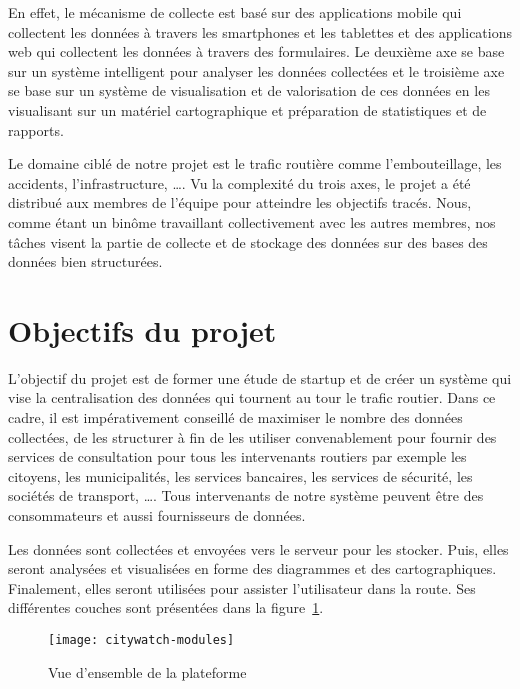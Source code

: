 En effet, le mécanisme de collecte est basé sur des applications mobile qui
collectent les données à travers les smartphones et les tablettes et des
applications web qui collectent les données à travers des formulaires. Le
deuxième axe se base sur un système intelligent pour analyser les données
collectées et le troisième axe se base sur un système de visualisation et de
valorisation de ces données en les visualisant sur un matériel cartographique
et préparation de statistiques et de rapports.

Le domaine ciblé de notre projet est le trafic routière comme l'embouteillage,
les accidents, l'infrastructure, \ldots.  Vu la complexité du trois axes, le
projet a été distribué aux membres de l'équipe  pour
atteindre les objectifs tracés. Nous, comme étant un binôme travaillant
collectivement avec les autres membres, nos tâches visent la partie de collecte
et de stockage des données sur des bases des données bien structurées.

\section{Objectifs du projet}

L'objectif du projet  est de former une étude de startup
et de créer un système qui vise la centralisation des données qui tournent au
tour le trafic routier. Dans ce cadre, il est impérativement conseillé de
maximiser le nombre des données collectées, de les structurer à fin de les
utiliser convenablement pour fournir des services de consultation pour tous les
intervenants routiers par exemple les citoyens, les municipalités, les services
bancaires, les services de sécurité, les sociétés de transport, \ldots.  Tous
intervenants de notre système peuvent être des consommateurs et aussi
fournisseurs de données.

Les données sont collectées et envoyées vers le serveur pour les stocker. Puis,
elles seront analysées et visualisées en forme des diagrammes et des
cartographiques.  Finalement, elles seront utilisées pour assister
l'utilisateur dans la route.  Ses différentes couches sont présentées dans la
figure~\ref{fig:citywatch-modules}.

\begin{figure}[H]
    \centering
    \texttt{[image: citywatch-modules]}
    \caption{Vue d'ensemble de la plateforme }
\label{fig:citywatch-modules}
\end{figure}

